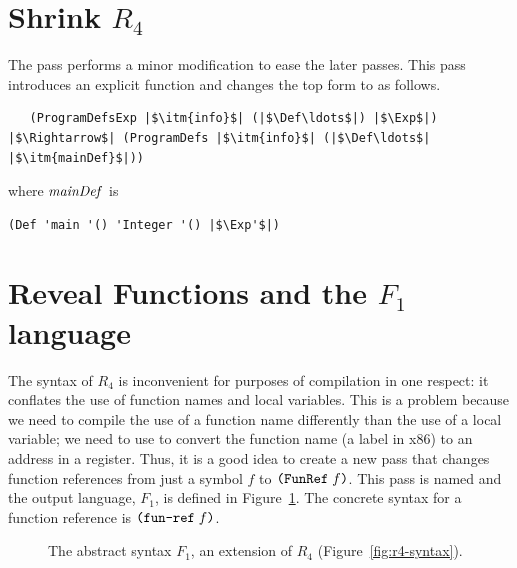 \documentclass[11pt]{book}
\newcommand{\gray}[1]{{\color{gray} #1}}
\begin{document}
\section{Shrink $R_4$}
\label{sec:shrink-r4}

The  pass performs a minor modification to ease the
later passes. This pass introduces an explicit  function
and changes the top  form to
 as follows.
\begin{lstlisting}
   (ProgramDefsExp |$\itm{info}$| (|$\Def\ldots$|) |$\Exp$|)
|$\Rightarrow$| (ProgramDefs |$\itm{info}$| (|$\Def\ldots$| |$\itm{mainDef}$|))
\end{lstlisting}
where $\mathit{mainDef}$ is
\begin{lstlisting}
(Def 'main '() 'Integer '() |$\Exp'$|)
\end{lstlisting}


\section{Reveal Functions and the $F_1$ language}
\label{sec:reveal-functions-r4}

The syntax of $R_4$ is inconvenient for purposes of compilation in one
respect: it conflates the use of function names and local
variables. This is a problem because we need to compile the use of a
function name differently than the use of a local variable; we need to
use  to convert the function name (a label in x86) to an
address in a register.  Thus, it is a good idea to create a new pass
that changes function references from just a symbol $f$ to
$\texttt{(FunRef}\;f\texttt{)}$. This pass is named  and the
output language, $F_1$, is defined in Figure~\ref{fig:f1-syntax}.
The concrete syntax for a function reference is $\texttt{(fun-ref}\;f\texttt{)}$.

\begin{figure}[tp]
\centering
\fbox{
\begin{minipage}{0.96\textwidth}
\[
\begin{array}{lcl}
\Exp &::=& \ldots \mid \FUNREF{\Var}\\
 \Def &::=& \gray{ \FUNDEF{\Var}{([\Var \code{:} \Type]\ldots)}{\Type}{\code{'()}}{\Exp} }\\
  F_1 &::=& \PROGRAMDEFS{\code{'()}}{\LP \Def\ldots \RP}
\end{array}
\]
\end{minipage}
}
\caption{The abstract syntax $F_1$, an extension of $R_4$
  (Figure~\ref{fig:r4-syntax}).}
\label{fig:f1-syntax}
\end{figure}
\end{document}
